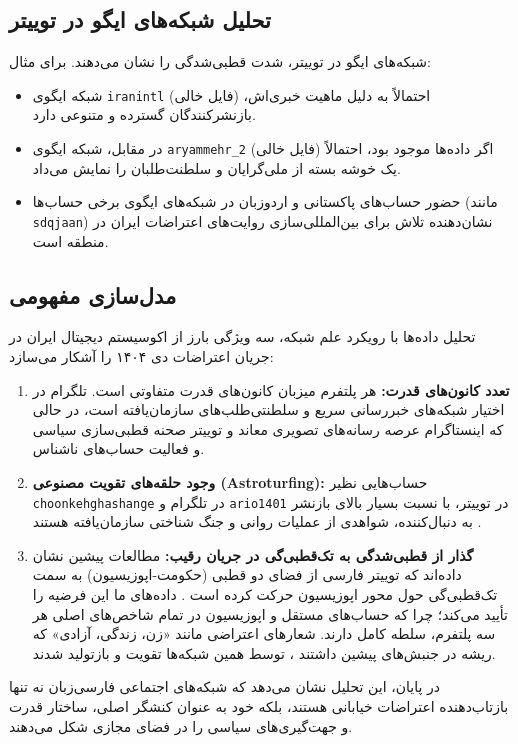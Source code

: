 \documentclass{article}
\begin{document}
	\subsection{تحلیل شبکه‌های ایگو در توییتر}
	شبکه‌های ایگو در توییتر، شدت قطبی‌شدگی را نشان می‌دهند. برای مثال:
	\begin{itemize}
		\item شبکه ایگوی \texttt{iranintl} (فایل خالی) احتمالاً به دلیل ماهیت خبری‌اش، بازنشرکنندگان گسترده و متنوعی دارد.
		\item در مقابل، شبکه ایگوی \texttt{aryammehr\_2} (فایل خالی) اگر داده‌ها موجود بود، احتمالاً یک خوشه بسته از ملی‌گرایان و سلطنت‌طلبان را نمایش می‌داد.
		\item حضور حساب‌های پاکستانی و اردو‌زبان در شبکه‌های ایگوی برخی حساب‌ها (مانند \texttt{sdqjaan}) نشان‌دهنده تلاش برای بین‌المللی‌سازی روایت‌های اعتراضات ایران در منطقه است.
	\end{itemize}
	
	\subsection{ مدل‌سازی مفهومی}
	تحلیل داده‌ها با رویکرد علم شبکه، سه ویژگی بارز از اکوسیستم دیجیتال ایران در جریان اعتراضات دی ۱۴۰۴ را آشکار می‌سازد:
	
	\begin{enumerate}
		\item \textbf{تعدد کانون‌های قدرت:} هر پلتفرم میزبان کانون‌های قدرت متفاوتی است. تلگرام در اختیار شبکه‌های خبررسانی سریع و سلطنتی‌طلب‌های سازمان‌یافته است، در حالی که اینستاگرام عرصه رسانه‌های تصویری معاند و توییتر صحنه قطبی‌سازی سیاسی و فعالیت حساب‌های ناشناس.
		\item \textbf{وجود حلقه‌های تقویت مصنوعی (Astroturfing):} حساب‌هایی نظیر \texttt{choonkehghashange} در تلگرام و \texttt{ario1401} در توییتر، با نسبت بسیار بالای بازنشر به دنبال‌کننده، شواهدی از عملیات روانی و جنگ شناختی سازمان‌یافته هستند .
		\item \textbf{گذار از قطبی‌شدگی به تک‌قطبی‌گی در جریان رقیب:} مطالعات پیشین نشان داده‌اند که توییتر فارسی از فضای دو قطبی (حکومت-اپوزیسیون) به سمت تک‌قطبی‌گی حول محور اپوزیسیون حرکت کرده است . داده‌های ما این فرضیه را تأیید می‌کند؛ چرا که حساب‌های مستقل و اپوزیسیون در تمام شاخص‌های اصلی هر سه پلتفرم، سلطه کامل دارند. شعارهای اعتراضی مانند «زن، زندگی، آزادی» که ریشه در جنبش‌های پیشین داشتند ، توسط همین شبکه‌ها تقویت و بازتولید شدند.
	\end{enumerate}
	
	در پایان، این تحلیل نشان می‌دهد که شبکه‌های اجتماعی فارسی‌زبان نه تنها بازتاب‌دهنده اعتراضات خیابانی هستند، بلکه خود به عنوان کنشگر اصلی، ساختار قدرت و جهت‌گیری‌های سیاسی را در فضای مجازی شکل می‌دهند.
	
\end{document}

